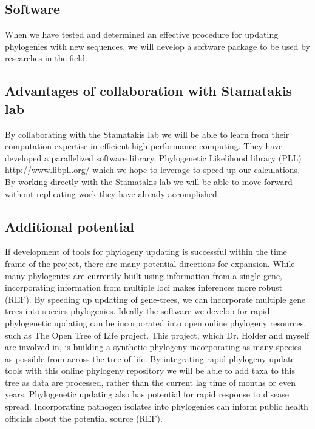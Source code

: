 \documentclass[10pt]{article}
\begin{document}
\subsection*{Software}
When we have tested and determined an effective procedure for updating phylogenies with new sequences, we will develop a software package to be used by researches in the field. %

\subsection*{Advantages of collaboration with Stamatakis lab}
By collaborating with the Stamatakis lab we will be able to learn from their computation expertise in efficient high performance computing. They have developed a parallelized software library, Phylogenetic Likelihood library (PLL) \url{http://www.libpll.org/} which we hope to leverage to speed up our calculations. By working directly with the Stamatakis lab we will be able to move forward without replicating work they have already accomplished. 


\subsection*{Additional potential}
If development of tools for phylogeny updating is successful within the time frame of the project, there are many potential directions for expansion. While many phylogenies are currently built using information from a single gene, incorporating information from multiple loci makes inferences more robust (REF). By speeding up updating of gene-trees, we can incorporate multiple gene trees into species phylogenies.
Ideally the software we develop for rapid phylogenetic updating can be incorporated into open online phylogeny resources, such as The Open Tree of Life project. This project, which Dr. Holder and myself are involved in, is building a synthetic phylogeny incorporating as many species as possible from across the tree of life. %
By integrating rapid phylogeny update tools with this online phylogeny repository we will be able to add taxa to this tree as data are processed, rather than the current lag time of months or even years. %
 Phylogenetic updating also has potential for rapid response to disease spread. Incorporating pathogen isolates into phylogenies can inform public health officials about the potential source (REF). 
\end{document}

